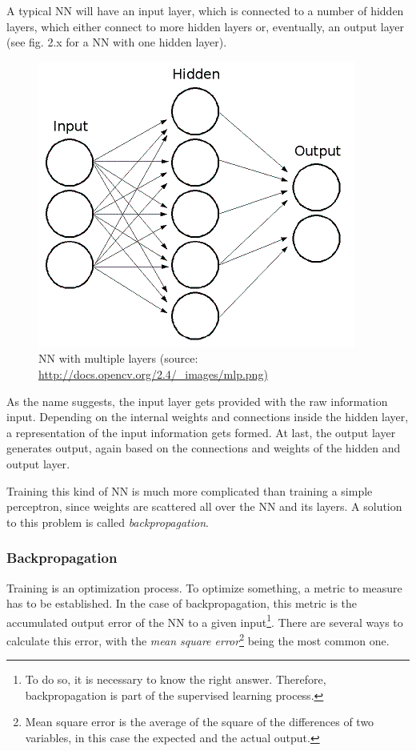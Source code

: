 A typical NN will have an input layer, which is connected to a number of hidden layers, which either connect to more hidden layers or, eventually, an output layer (see fig. 2.x for a NN with one hidden layer).

\begin{figure}[H]
	\begin{center}
		\includegraphics[scale=0.8]{img/mlp.png}
		\caption{NN with multiple layers (source: \url{http://docs.opencv.org/2.4/_images/mlp.png)}}
		\label{fig:fig2.2}
	\end{center}
\end{figure}

As the name suggests, the input layer gets provided with the raw information input. Depending on the internal weights and connections inside the hidden layer, a representation of the input information gets formed. At last, the output layer generates output, again based on the connections and weights of the hidden and output layer\cite{Stergiou96}.

Training this kind of NN is much more complicated than training a simple perceptron, since weights are scattered all over the NN and its layers. A solution to this problem is called \emph{backpropagation}\cite{Shiffman12}.


\subsubsection{Backpropagation}
Training is an optimization process. To optimize something, a metric to measure has to be established. In the case of backpropagation, this metric is the accumulated output error of the NN to a given input\footnote{To do so, it is necessary to know the right answer. Therefore, backpropagation is part of the supervised learning process.}. There are several ways to calculate this error, with the \emph{mean square error}\footnote{Mean square error is the average of the square of the differences of two variables, in this case the expected and the actual output.} being the most common one\cite{Bourg04}.

